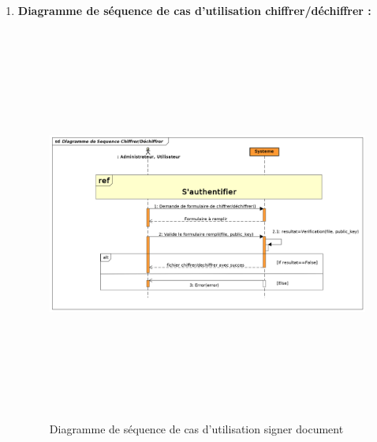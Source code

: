 \begin{enumerate}
		 	\item \textbf{Diagramme de séquence de cas d'utilisation chiffrer/déchiffrer :}
		 	\begin{figure}[H]
		 		\centering
		 		\includegraphics[width=18cm, height=13cm]{../Diagrammes/DiagrammeSequences/chiffrerDechiffrer.png}
		 		\caption{Diagramme de séquence de cas d'utilisation signer document}
		 		\label{diaseq5}
		 	\end{figure}
		 	

\end{enumerate}
